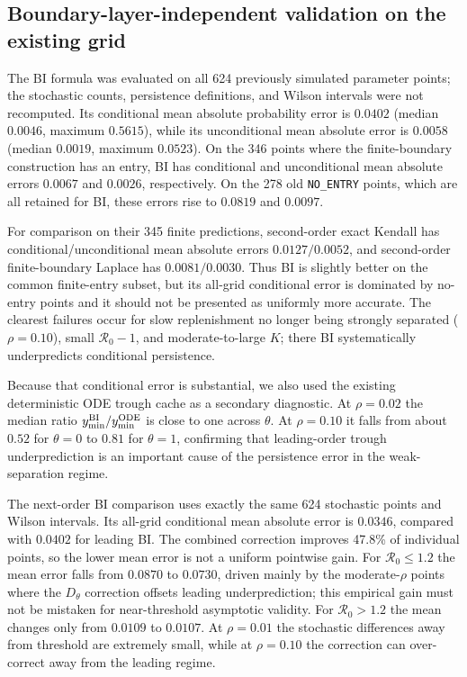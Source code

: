 \documentclass[11pt,a4paper]{article}
\newcommand{\Rzero}{\mathcal R_0}
\begin{document}
\clearpage
{}
\clearpage
{}

\subsection{Boundary-layer-independent validation on the existing grid}
The BI formula was evaluated on all 624 previously simulated parameter points;
the stochastic counts, persistence definitions, and Wilson intervals were not
recomputed.  Its conditional mean absolute probability error is $0.0402$
(median $0.0046$, maximum $0.5615$), while its unconditional mean absolute
error is $0.0058$ (median $0.0019$, maximum $0.0523$).  On the 346 points where
the finite-boundary construction has an entry, BI has conditional and
unconditional mean absolute errors $0.0067$ and $0.0026$, respectively.  On
the 278 old \texttt{NO\_ENTRY} points, which are all retained for BI, these
errors rise to $0.0819$ and $0.0097$.

For comparison on their 345 finite predictions, second-order exact Kendall has
conditional/unconditional mean absolute errors $0.0127/0.0052$, and
second-order finite-boundary Laplace has $0.0081/0.0030$.  Thus BI is slightly
better on the common finite-entry subset, but its all-grid conditional error is
dominated by no-entry points and it should not be presented as uniformly more
accurate.  The clearest failures occur for slow replenishment no longer being
strongly separated ($\rho=0.10$), small $\Rzero-1$, and moderate-to-large $K$;
there BI systematically underpredicts conditional persistence.

Because that conditional error is substantial, we also used the existing
deterministic ODE trough cache as a secondary diagnostic.  At $\rho=0.02$ the
median ratio $y_{\min}^{\rm BI}/y_{\min}^{\rm ODE}$ is close to one across
$\theta$.  At $\rho=0.10$ it falls from about $0.52$ for $\theta=0$ to $0.81$
for $\theta=1$, confirming that leading-order trough underprediction is an
important cause of the persistence error in the weak-separation regime.

The next-order BI comparison uses exactly the same 624 stochastic points and
Wilson intervals.  Its all-grid conditional mean absolute error is $0.0346$,
compared with $0.0402$ for leading BI.  The combined correction improves 47.8\%
of individual points, so the lower mean error is not a uniform pointwise gain.
For $\Rzero\leq1.2$ the mean error falls from $0.0870$ to $0.0730$, driven
mainly by the moderate-$\rho$ points where the $D_\theta$ correction offsets
leading underprediction; this empirical gain must not be mistaken for
near-threshold asymptotic validity.  For $\Rzero>1.2$ the mean changes only from
$0.0109$ to $0.0107$.  At $\rho=0.01$ the stochastic differences away from
threshold are extremely small, while at $\rho=0.10$ the correction can
over-correct away from the leading regime.
\end{document}
